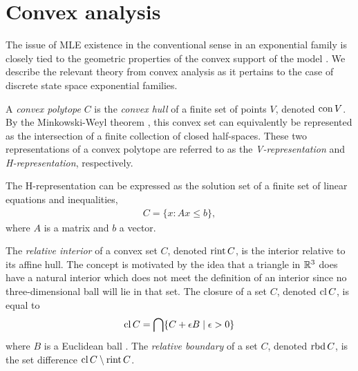 \section{Convex analysis} \label{S:Convex analysis}
The issue of MLE existence in the conventional sense in an exponential family is 
closely tied to the geometric properties of 
the convex support of the model \citep{Barndorff, Geyer:gdor, Rinaldo:2009}.  We 
describe the relevant theory from convex analysis as it pertains to the case of 
discrete state space exponential families.

A \emph{convex polytope} $C$ is the \emph{convex hull} of a finite set of points $V$, denoted $\operatorname{con} V$.
By the Minkowski-Weyl theorem \citep[Theorem 19.1]{Rockafellar:1970}, this convex 
set can equivalently be represented as the intersection of a finite collection of 
closed half-spaces.  These two representations of a convex polytope are referred to 
as the \emph{V-representation} and \emph{H-representation}, respectively.  

The H-representation can be expressed as the solution set of a finite set of linear 
equations and inequalities,
\begin{align*}
	C = \{x: Ax \leq b \},
\end{align*}
where $A$ is a matrix and $b$ a vector.

The \emph{relative interior} of a convex set $C$, denoted $\operatorname{rint} C$, is the interior 
relative to its affine hull.  The concept is motivated by the idea that a triangle
in ${\mathbb R}^3$ does have a natural interior which does not meet the definition of an interior
since no three-dimensional ball will lie in that set.  The closure of a set $C$, denoted $\operatorname{cl} C$, is equal to
\begin{align*}
	\operatorname{cl} C = \bigcap \{C + \epsilon B \mid \epsilon > 0 \}
\end{align*}
where $B$ is a Euclidean ball \citep[Chapter 1]{Rockafellar:1970}.  The \emph{relative boundary} of a set $C$, denoted $\operatorname{rbd} C$, is the set difference $\operatorname{cl} C \setminus \operatorname{rint} C$.

